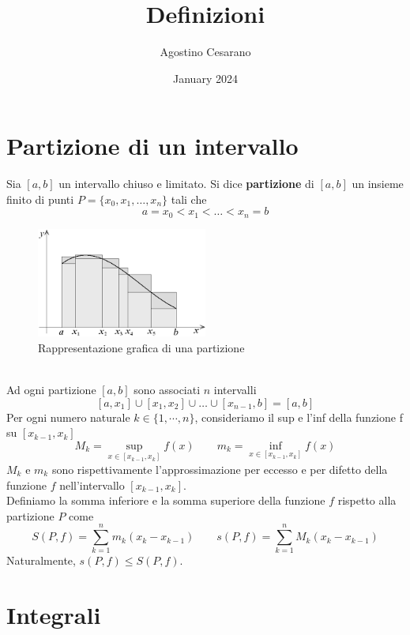 \documentclass{article}
\title{Definizioni}
\author{Agostino Cesarano}
\date{January 2024}
\begin{document}
\maketitle
\setcounter{part}{4}
\part{Partizione di un intervallo}
Sia $[a,b]$ un intervallo chiuso e limitato. Si dice \textbf{partizione} di
$[a,b]$ un insieme finito di punti $P=\{x_0,x_1,\dots,x_n\}$ tali che
\begin{equation*}
    a=x_0<x_1<\dots<x_n=b
\end{equation*}
\begin{figure}[h]
    \centering
    \includegraphics[width=0.5\textwidth]{partizioni.png}
    \caption{Rappresentazione grafica di una partizione}
\end{figure}\\
Ad ogni partizione $[a,b]$ sono associati $n$ intervalli
\[[a,x_1]\cup[x_1,x_2]\cup \dots \cup [x_{n-1},b]=[a,b]\]
Per ogni numero naturale $k \in \{1,\cdots, n\}$, consideriamo il sup e l'inf della funzione f su $[x_{k-1}, x_k]$
\begin{equation*}
    M_k = \sup_{x \in [x_{k-1},x_k]} f(x) \qquad m_k = \inf_{x \in [x_{k-1},x_k]} f(x)
\end{equation*}
$M_k$ e $m_k$ sono rispettivamente l'approssimazione per eccesso e per difetto della funzione $f$ nell'intervallo $[x_{k-1},x_k]$.\\
Definiamo la somma inferiore e la somma superiore della funzione $f$ rispetto alla partizione $P$ come
\begin{equation*}
    S(P,f) = \sum_{k=1}^n m_k(x_k-x_{k-1}) \qquad s(P,f) = \sum_{k=1}^n M_k(x_k-x_{k-1})
\end{equation*}
Naturalmente, $s(P,f) \leq S(P,f)$.
\part{Integrali}
\end{document}

